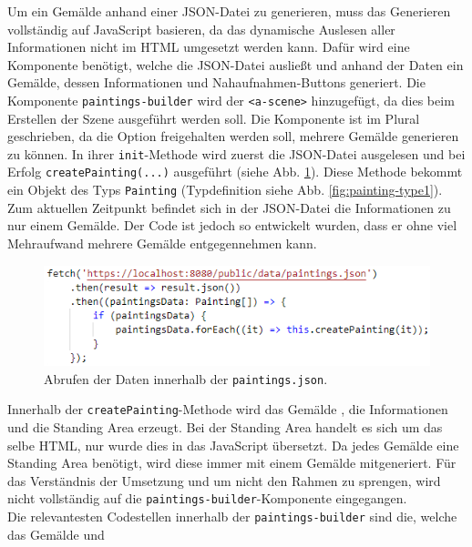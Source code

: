\documentclass[a4paper,12pt,oneside]{article}
\begin{document}
        Um ein Gemälde anhand einer JSON-Datei zu generieren,
        muss das Generieren vollständig auf JavaScript
        basieren, da das dynamische Auslesen aller Informationen
        nicht im HTML umgesetzt werden kann. Dafür wird eine 
        Komponente benötigt,
        welche die JSON-Datei ausließt und anhand der Daten ein Gemälde,
        dessen Informationen und Nahaufnahmen-Buttons generiert.
        Die Komponente \texttt{paintings-builder} wird der 
        \texttt{<a-scene>} hinzugefügt, da
        dies beim Erstellen der Szene ausgeführt werden soll. Die
        Komponente ist im Plural geschrieben, da die Option freigehalten
        werden soll, mehrere Gemälde generieren zu können.
        In ihrer \texttt{init}-Methode wird zuerst die JSON-Datei
        ausgelesen und bei Erfolg \texttt{createPainting(...)}
        ausgeführt (siehe Abb. \ref{fig:paintings-builder1}).
        Diese Methode bekommt ein Objekt des Typs \texttt{Painting}
        (Typdefinition siehe Abb. \ref{fig:painting-type1}). Zum aktuellen
        Zeitpunkt befindet sich in der JSON-Datei die Informationen
        zu nur einem Gemälde. Der Code ist jedoch so entwickelt wurden,
        dass er ohne viel Mehraufwand mehrere Gemälde entgegennehmen kann.
        \begin{figure}
          \centering
          \includegraphics{img/coding/paintings-builder1.png}
          \caption{Abrufen der Daten innerhalb der \texttt{paintings.json}.}
          \label{fig:paintings-builder1}
        \end{figure}
        Innerhalb der \texttt{createPainting}-Methode wird das Gemälde
        , die Informationen und die Standing Area erzeugt. Bei der Standing
        Area handelt es sich um das selbe HTML, nur wurde dies in das
        JavaScript übersetzt. Da jedes Gemälde eine Standing Area benötigt,
        wird diese immer mit einem Gemälde mitgeneriert. Für das Verständnis
        der Umsetzung und um nicht den Rahmen zu sprengen, wird nicht 
        vollständig auf die \texttt{paintings-builder}-Komponente 
        eingegangen. \\
        Die relevantesten Codestellen innerhalb der 
        \texttt{paintings-builder} sind die, welche das Gemälde und
\end{document}
